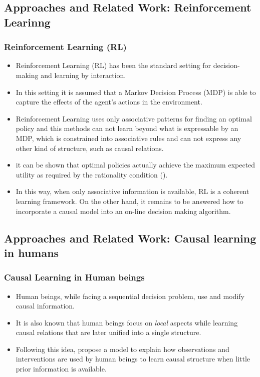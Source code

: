 \documentclass{beamer}
\theoremstyle{plain}
\begin{document}
\subsection{Approaches and Related Work: Reinforcement Learinng}
\begin{frame}
\frametitle{Reinforcement Learning (RL)}
\begin{itemize}
\item Reinforcement Learning (RL) has been the standard setting for decision-making and learning by interaction.
\item  In this setting it is assumed that a Markov Decision Process (MDP) is able to capture the effects of the agent's actions in the environment.
\item Reinforcement Learning uses only associative patterns for finding an optimal policy and this methods can not learn beyond what is expressable by an MDP, which is constrained into associative rules and can not express any other kind of structure, such as causal relations. 
\item it can be shown that optimal policies actually achieve the maximum expected utility as required by the rationality condition (\cite{webb2007game}).
\item In this way, when only associative information is available, RL is a coherent learning framework. On the other hand, it remains to be answered how to incorporate a causal model into an on-line decision making algorithm.
\end{itemize}
\end{frame}
\subsection{Approaches and Related Work: Causal learning in humans}
\begin{frame}
\frametitle{Causal Learning in Human beings}
\begin{itemize}
\item Human beings, while facing a sequential decision problem, use and modify causal information.
\item It is also known that human beings focus on \textit{local} aspects while learning causal relations that are later unified into a single structure.
\item  Following this idea, \cite{wellen2012learning} propose a model to explain how observations  and interventions are used by human beings to learn causal structure when little prior information is available. 
\end{itemize}
\end{frame}
\end{document}
